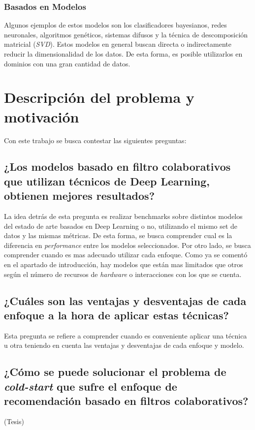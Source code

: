 \documentclass[11pt,a4paper,twoside]{thesis}
\begin{document}
 \subsubsection{Basados en Modelos}
 
Algunos ejemplos de estos modelos son los clasificadores bayesianos, redes neuronales, algoritmos genéticos, sistemas difusos y la técnica de descomposición matricial (\textit{SVD}). Estos modelos en general buscan directa o indirectamente reducir la dimensionalidad de los datos. De esta forma, es posible utilizarlos en dominios con una gran cantidad de datos.

\clearpage
\section{Descripción del problema y motivación}

Con este trabajo se busca contestar las siguientes preguntas:

\subsection{¿Los modelos basado en filtro colaborativos que utilizan técnicos de Deep Learning, obtienen mejores resultados?}

La idea detrás de esta pregunta es realizar benchmarks sobre distintos modelos del estado de arte basados en Deep Learning o no, utilizando el mismo set de datos y las mismas métricas. De esta forma, se busca comprender cual es la diferencia en \textit{performance} entre los modelos seleccionados. Por otro lado, se busca comprender cuando es mas adecuado utilizar cada enfoque. Como ya se comentó en el apartado de introducción, hay modelos que están mas limitados que otros según el número de recursos de \textit{hardware} o interacciones con los que se cuenta.

\subsection{¿Cuáles son las ventajas y desventajas de cada enfoque a la hora de aplicar estas técnicas?}

Esta pregunta se refiere a comprender cuando es conveniente aplicar una técnica u otra teniendo en cuenta las ventajas y desventajas de cada enfoque y modelo.

\subsection{¿Cómo se puede solucionar el problema de \textit{cold-start} que sufre el enfoque de recomendación basado en filtros colaborativos?} (Tesis)
\end{document}
